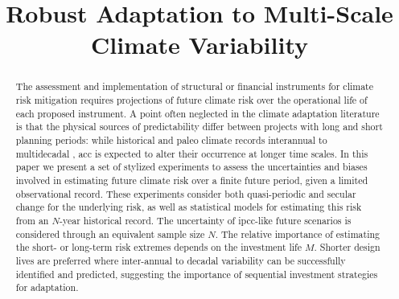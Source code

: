 \documentclass[
  draft,
  linenumbers
]{agujournal2019}
\begin{document}
\title{Robust Adaptation to Multi-Scale Climate Variability}

\begin{keypoints}
  \item {}
  \item {}
  \item {}
\end{keypoints}

\begin{abstract}
  The assessment and implementation of structural or financial instruments for climate risk mitigation requires projections of future climate risk over the operational life of each proposed instrument.
  A point often neglected in the climate adaptation literature is that the physical sources of predictability differ between projects with long and short planning periods: while historical and paleo climate records   interannual to multidecadal  , \acrlong{acc} is expected to alter their occurrence at longer time scales.
  In this paper we present a set of stylized experiments to assess the uncertainties and biases involved in estimating future climate risk over a finite future period, given a limited observational record.
  These experiments consider both quasi-periodic and secular change for the underlying risk, as well as statistical models for estimating this risk from an $N$-year historical record.
  The uncertainty of \acrshort{ipcc}-like future scenarios is considered through an equivalent sample size $N$. 
  The relative importance of estimating the short- or long-term risk extremes depends on the investment life $M$.
  Shorter design lives are preferred  where inter-annual to decadal variability can be successfully identified and predicted, suggesting the importance of sequential investment strategies for adaptation. 
\end{abstract}
\end{document}
